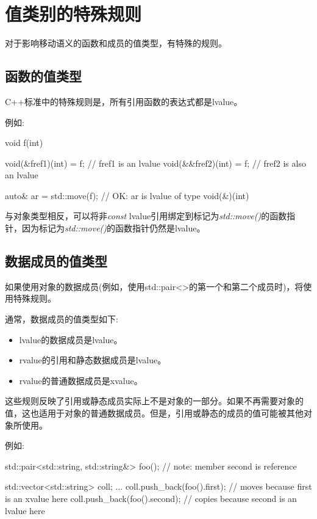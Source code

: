\section{值类别的特殊规则}
对于影响移动语义的函数和成员的值类型，有特殊的规则。

\subsection{函数的值类型}

C++标准中的特殊规则是，所有引用函数的表达式都是lvalue。

例如:

\begin{cppcode}
void f(int) {
}

void(&fref1)(int) = f; // fref1 is an lvalue
void(&&fref2)(int) = f; // fref2 is also an lvalue

auto& ar = std::move(f); // OK: ar is lvalue of type void(&)(int)
\end{cppcode}

与对象类型相反，可以将非\textit{const} lvalue引用绑定到标记为\textit{std::move()}的函数指针，因为标记为\textit{std::move()}的函数指针仍然是lvalue。

\subsection{数据成员的值类型}

如果使用对象的数据成员(例如，使用std::pair<>的第一个和第二个成员时)，将使用特殊规则。

通常，数据成员的值类型如下:

\begin{itemize}
	\item lvalue的数据成员是lvalue。
	\item rvalue的引用和静态数据成员是lvalue。
	\item rvalue的普通数据成员是xvalue。
\end{itemize}

这些规则反映了引用或静态成员实际上不是对象的一部分。如果不再需要对象的值，这也适用于对象的普通数据成员。但是，引用或静态的成员的值可能被其他对象所使用。

例如:

\begin{cppcode}
std::pair<std::string, std::string&> foo(); // note: member second is reference

std::vector<std::string> coll;
...
coll.push_back(foo().first); // moves because first is an xvalue here
coll.push_back(foo().second); // copies because second is an lvalue here
\end{cppcode}

